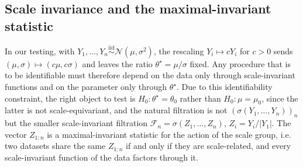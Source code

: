 \documentclass[numsec,webpdf,modern,medium,namedate]{oup-authoring-template}
\theoremstyle{thmstyleone}%
\theoremstyle{thmstyletwo}%
\theoremstyle{thmstylethree}%
\newcommand{\E}{\mathbb{E}}
\newcommand{\1}{\mathbf{1}}
\begin{document}

\subsection{Scale invariance and the maximal-invariant statistic}
In our testing, with \(Y_1,\ldots,Y_n\stackrel{\mathrm{iid}}{\sim}\mathcal{N}(\mu,\sigma^2)\), the rescaling \(Y_i\mapsto cY_i\) for \(c>0\) sends \((\mu,\sigma)\mapsto(c\mu,c\sigma)\) and leaves the ratio \(\theta^\star=\mu/\sigma\) fixed. Any procedure that is to be identifiable must therefore depend on the data only through scale-invariant functions and on the parameter only through $\theta^\star$. Due to this identifiability constraint, the right object to test is
\(H_0:\theta^\star=\theta_0\) rather than \(H_0:\mu=\mu_0\), since the latter is not scale-equivariant, and the natural filtration is not \((\sigma(Y_1,\ldots,Y_n))_n\) but the smaller scale-invariant filtration \(\mathcal{F}_n=\sigma(Z_1,\ldots,Z_n)\), \(Z_i=Y_i/|Y_1|\). The vector \(Z_{1:n}\) is a maximal-invariant statistic for the action of the scale group, i.e. two datasets share the same \(Z_{1:n}\) if and only if they are scale-related, and every scale-invariant function of the data factors through it.
\end{document}
